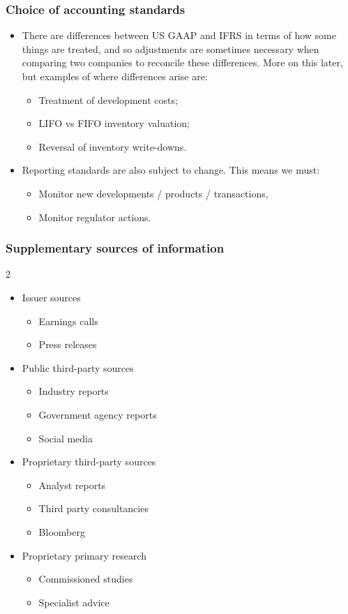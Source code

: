 \documentclass[../notes_compiled.tex]{subfiles}
\begin{document}
\subsubsection{Choice of accounting standards}
\begin{itemize}
\item There are differences between US GAAP and IFRS in terms of how some things are treated, and so adjustments are sometimes necessary when comparing two companies to reconcile these differences. More on this later, but examples of where differences arise are:
\begin{itemize}
\item Treatment of development costs;
\item LIFO vs FIFO inventory valuation;
\item Reversal of inventory write-downs.
\end{itemize}
\item Reporting standards are also subject to change. This means we must:
\begin{itemize}
\item Monitor new developments / products / transactions,
\item Monitor regulator actions.
\end{itemize}
\end{itemize}

\subsubsection{Supplementary sources of information}
\begin{multicols}{2}
\begin{itemize}
\item Issuer sources
\begin{itemize}
\item Earnings calls
\item Press releases
\end{itemize}
\item Public third-party sources
\begin{itemize}
\item Industry reports
\item Government agency reports
\item Social media
\end{itemize}
\item Proprietary third-party sources
\begin{itemize}
\item Analyst reports
\item Third party consultancies
\item Bloomberg
\end{itemize}
\item Proprietary primary research
\begin{itemize}
\item Commissioned studies
\item Specialist advice
\end{itemize}
\end{itemize}
\end{multicols}
\end{document}

